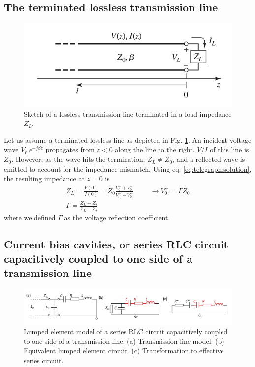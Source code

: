 \subsection{The terminated lossless transmission line}
\begin{figure}
	\centering
	\includegraphics[width=0.4\linewidth]{chapter-theory/figs-RF/pozar_terminated_lossless}
	\caption{Sketch of a lossless transmission line terminated in a load impedance $Z_L$.}
	\label{fig:pozarterminatedlossless}
\end{figure}
Let us assume a terminated lossless line as depicted in Fig. \ref{fig:pozarterminatedlossless}.
An incident voltage wave $V_0^+ e^{-j\beta z}$ propagates from $z<0$ along the line to the right.
$V/I$ of this line is $Z_0$.
However, as the wave hits the termination, $Z_L \neq Z_0$, and a reflected wave is emitted to account for the impedance mismatch.
Using eq. \ref{eq:telegraph:solution}, the resulting impedance at $z=0$ is 
\begin{align}
Z_L=\frac{V(0)}{I(0)}=Z_0\frac{V_0^++V_0^-}{V_0^+-V_0^-} \hspace{1cm} \rightarrow V_0^-=\Gamma Z_0 \\%
\Gamma = \frac{Z_L-Z_0}{Z_L+Z_0}
\end{align} 
where we defined $\Gamma$ as the voltage reflection coefficient.

\subsection{Current bias cavities, or series RLC circuit capacitively coupled to one side of a transmission line}
\begin{figure}[!h]
	\centering
	\includegraphics[width=0.7\linewidth]{chapter-theory/figs-RF/resonator_Daniel_crop}
	\caption{Lumped element model of a series RLC circuit capacitively coupled to one side of a transmission line. (a) Transmission line model. (b) Equivalent lumped element circuit. (c) Transformation to effective series circuit.}
	\label{fig:resonatordaniel}
\end{figure}

